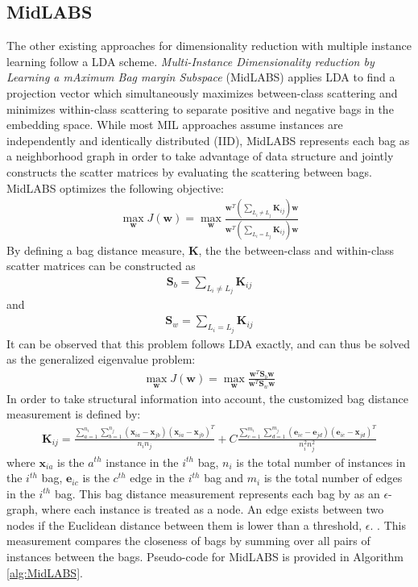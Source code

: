 \subsection{MidLABS}
The other existing approaches for dimensionality reduction with multiple instance learning follow a LDA scheme.  \textit{Multi-Instance Dimensionality reduction by Learning a mAximum Bag margin Subspace} (MidLABS) \citep{Ping2010MILDRMaxMargin} applies LDA to find a projection vector which simultaneously maximizes between-class scattering and minimizes within-class scattering to separate positive and negative bags in the embedding space.  While most MIL approaches assume instances are independently and identically distributed (IID), MidLABS represents each bag as a neighborhood graph in order to take advantage of data structure and jointly constructs  the scatter matrices by evaluating the scattering between bags. MidLABS optimizes the following objective:
\begin{align}
\max_{\bm{w}} J(\bm{w})= \max_{\bm{w}} \frac{\bm{w}^{T}(\sum_{L_{i} \neq L_{j}}\bm{K}_{ij})\bm{w}}{\bm{w}^{T}(\sum_{L_{i} = L_{j}}\bm{K}_{ij})\bm{w}}
\end{align}  
\noindent
By defining a bag distance measure, $\bm{K}$, the the between-class and within-class scatter matrices can be constructed as
\begin{align}
\bm{S}_{b} = \sum_{L_{i} \neq L_{j}}\bm{K}_{ij}
\end{align}
\noindent
and
\begin{align}
\bm{S}_{w} = \sum_{L_{i} = L_{j}}\bm{K}_{ij}
\end{align}
\noindent
It can be observed that this problem follows LDA exactly, and can thus be solved as the generalized eigenvalue problem:
\begin{align}
\max_{\bm{w}} J(\bm{w})= \max_{\bm{w}} \frac{\bm{w}^{T}\bm{S}_{b}\bm{w}}{\bm{w}^{T}\bm{S}_{w}\bm{w}}
\end{align}
\noindent
In order to take structural information into account, the customized bag distance measurement is defined by:
\begin{align}
	\bm{K}_{ij} = \frac{\sum_{a=1}^{n_{i}}\sum_{b=1}^{n_{j}} (\bm{x}_{ia} - \bm{x}_{jb})(\bm{x}_{ia} - \bm{x}_{jb})^{T}  }{n_{i}n_{j}} + C\frac{\sum_{c=1}^{m_{i}}\sum_{d=1}^{m_{j}} (\bm{e}_{ic} - \bm{e}_{jd})(\bm{e}_{ic} - \bm{x}_{jd})^{T}  }{n_{i}^{2}n_{j}^{2}}
\end{align}
\noindent
where $\bm{x}_{ia}$ is the $a^{th}$ instance in the $i^{th}$ bag, $n_i$ is the total number of instances in the $i^{th}$ bag, $\bm{e}_{ic}$ is the $c^{th}$ edge in the $i^{th}$ bag and $m_{i}$ is the total number of edges in the $i^{th}$ bag.  This bag distance measurement represents each bag by as an $\epsilon$-graph, where each instance is treated as a node.  An edge exists between two  nodes  if the Euclidean distance between them is lower than a threshold, $\epsilon$. \citep{Latham2015MIFeatureRankingThesis}.  This measurement compares the closeness of bags by summing over all pairs of instances between the bags. Pseudo-code for MidLABS is provided in Algorithm \ref{alg:MidLABS}.

